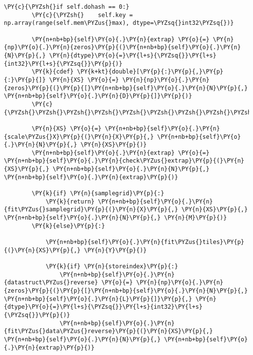 \begin{Verbatim}[commandchars=\\\{\}]
        \PY{c}{\PYZsh{}if self.dohash == 0:}
        \PY{c}{\PYZsh{}    self.key = np.array(range(self.mem\PYZus{}max), dtype=\PYZsq{}int32\PYZsq{})}

        \PY{n+nb+bp}{self}\PY{o}{.}\PY{n}{extrap} \PY{o}{=} \PY{n}{np}\PY{o}{.}\PY{n}{zeros}\PY{p}{(}\PY{n+nb+bp}{self}\PY{o}{.}\PY{n}{N}\PY{p}{,} \PY{n}{dtype}\PY{o}{=}\PY{l+s}{\PYZsq{}}\PY{l+s}{int32}\PY{l+s}{\PYZsq{}}\PY{p}{)}
        \PY{k}{cdef} \PY{k+kt}{double}[\PY{p}{:}\PY{p}{,}\PY{p}{:}\PY{p}{]} \PY{n}{XS} \PY{o}{=} \PY{n}{np}\PY{o}{.}\PY{n}{zeros}\PY{p}{(}\PY{p}{[}\PY{n+nb+bp}{self}\PY{o}{.}\PY{n}{N}\PY{p}{,} \PY{n+nb+bp}{self}\PY{o}{.}\PY{n}{D}\PY{p}{]}\PY{p}{)}
        \PY{c}{\PYZsh{}\PYZsh{}\PYZsh{}\PYZsh{}\PYZsh{}\PYZsh{}\PYZsh{}\PYZsh{}\PYZsh{}\PYZsh{}\PYZsh{}\PYZsh{}\PYZsh{}\PYZsh{}\PYZsh{}\PYZsh{}\PYZsh{}\PYZsh{}\PYZsh{}\PYZsh{}\PYZsh{}\PYZsh{}\PYZsh{}\PYZsh{}\PYZsh{}\PYZsh{}\PYZsh{}\PYZsh{}\PYZsh{}\PYZsh{}\PYZsh{}\PYZsh{}\PYZsh{}\PYZsh{}\PYZsh{}\PYZsh{}\PYZsh{}\PYZsh{}\PYZsh{}\PYZsh{}\PYZsh{}\PYZsh{}\PYZsh{}\PYZsh{}\PYZsh{}\PYZsh{}\PYZsh{}\PYZsh{}\PYZsh{}\PYZsh{}\PYZsh{}\PYZsh{}\PYZsh{}\PYZsh{}\PYZsh{}\PYZsh{}\PYZsh{}\PYZsh{}\PYZsh{}\PYZsh{}\PYZsh{}\PYZsh{}\PYZsh{}}
        
        \PY{n}{XS} \PY{o}{=} \PY{n+nb+bp}{self}\PY{o}{.}\PY{n}{scale\PYZus{}X}\PY{p}{(}\PY{n}{X}\PY{p}{,} \PY{n+nb+bp}{self}\PY{o}{.}\PY{n}{N}\PY{p}{,} \PY{n}{XS}\PY{p}{)}
        \PY{n+nb+bp}{self}\PY{o}{.}\PY{n}{extrap} \PY{o}{=} \PY{n+nb+bp}{self}\PY{o}{.}\PY{n}{check\PYZus{}extrap}\PY{p}{(}\PY{n}{XS}\PY{p}{,} \PY{n+nb+bp}{self}\PY{o}{.}\PY{n}{N}\PY{p}{,} \PY{n+nb+bp}{self}\PY{o}{.}\PY{n}{extrap}\PY{p}{)}
        
        \PY{k}{if} \PY{n}{samplegrid}\PY{p}{:}
            \PY{k}{return} \PY{n+nb+bp}{self}\PY{o}{.}\PY{n}{fit\PYZus{}samplegrid}\PY{p}{(}\PY{n}{X}\PY{p}{,} \PY{n}{XS}\PY{p}{,} \PY{n+nb+bp}{self}\PY{o}{.}\PY{n}{N}\PY{p}{,} \PY{n}{M}\PY{p}{)}
        \PY{k}{else}\PY{p}{:}

            \PY{n+nb+bp}{self}\PY{o}{.}\PY{n}{fit\PYZus{}tiles}\PY{p}{(}\PY{n}{XS}\PY{p}{,} \PY{n}{Y}\PY{p}{)}
            
            \PY{k}{if} \PY{n}{storeindex}\PY{p}{:}
                \PY{n+nb+bp}{self}\PY{o}{.}\PY{n}{datastruct\PYZus{}reverse} \PY{o}{=} \PY{n}{np}\PY{o}{.}\PY{n}{zeros}\PY{p}{(}\PY{p}{[}\PY{n+nb+bp}{self}\PY{o}{.}\PY{n}{N}\PY{p}{,} \PY{n+nb+bp}{self}\PY{o}{.}\PY{n}{L}\PY{p}{]}\PY{p}{,} \PY{n}{dtype}\PY{o}{=}\PY{l+s}{\PYZsq{}}\PY{l+s}{int32}\PY{l+s}{\PYZsq{}}\PY{p}{)}
                \PY{n+nb+bp}{self}\PY{o}{.}\PY{n}{fit\PYZus{}data\PYZus{}reverse}\PY{p}{(}\PY{n}{XS}\PY{p}{,} \PY{n+nb+bp}{self}\PY{o}{.}\PY{n}{N}\PY{p}{,} \PY{n+nb+bp}{self}\PY{o}{.}\PY{n}{extrap}\PY{p}{)}
            

\end{Verbatim}
